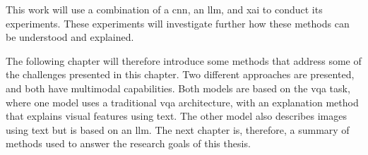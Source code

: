 This work will use a combination of a \gls{cnn}, an \gls{llm}, and \gls{xai} to conduct its experiments. 
These experiments will investigate further how these methods can be understood and explained. 


The following chapter will therefore introduce some methods that address some of the challenges presented in this chapter. Two different approaches are presented, and both have multimodal capabilities. Both models are based on the \gls{vqa} task, where one model uses a traditional \gls{vqa} architecture, with an explanation method that explains visual features using text. The other model also describes images using text but is based on an \gls{llm}. 
The next chapter is, therefore, a summary of methods used to answer the research goals of this thesis.